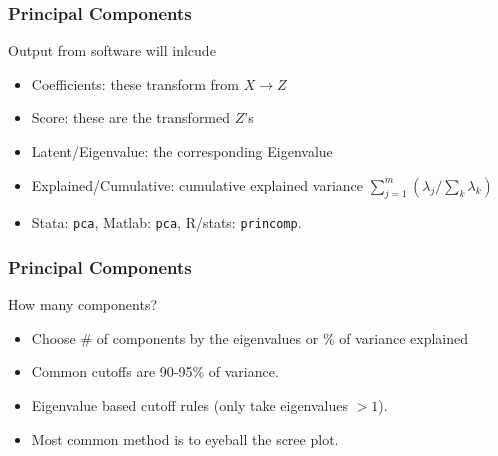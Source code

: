 \begin{frame}
\frametitle{Principal Components}
Output from software will inlcude
\begin{itemize}
\item Coefficients: these transform from $X\rightarrow Z$
\item Score: these are the transformed $Z$'s
\item Latent/Eigenvalue: the corresponding Eigenvalue
\item Explained/Cumulative: cumulative explained variance $ \sum_{j=1}^m( \lambda_j / \sum_k \lambda_k)$
\item Stata: \texttt{pca}, Matlab: \texttt{pca}, R/stats: \texttt{princomp}.
\end{itemize}
\end{frame}

\begin{frame}
\frametitle{Principal Components}
How many components?
\begin{itemize}
\item Choose \# of components by the eigenvalues or \% of variance explained
\item Common cutoffs are 90-95\% of variance.
\item Eigenvalue based cutoff rules (only take eigenvalues $ > 1$).
\item Most common method is to eyeball the scree plot.
\end{itemize}
\end{frame}


